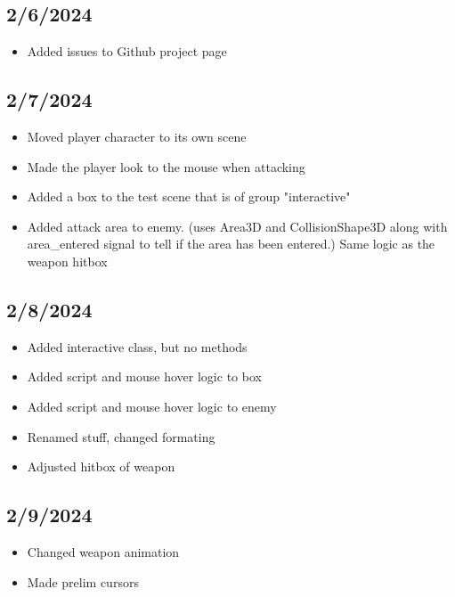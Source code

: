 \documentclass{article}
\begin{document}
\subsection*{2/6/2024}

\begin{itemize}
   \item Added issues to Github project page
\end{itemize}

\subsection*{2/7/2024}

\begin{itemize}
   \item Moved player character to its own scene
   \item Made the player look to the mouse when attacking
   \item Added a box to the test scene that is of group "interactive"
   \item Added attack area to enemy. (uses Area3D and CollisionShape3D along with area\_entered signal to tell if the area has been entered.) Same logic as the weapon hitbox
\end{itemize}

\subsection*{2/8/2024}

\begin{itemize}
   \item Added interactive class, but no methods
   \item Added script and mouse hover logic to box
   \item Added script and mouse hover logic to enemy
   \item Renamed stuff, changed formating
   \item Adjusted hitbox of weapon
\end{itemize}

\subsection*{2/9/2024}

\begin{itemize}
   \item Changed weapon animation
   \item Made prelim cursors
\end{itemize}
\end{document}
